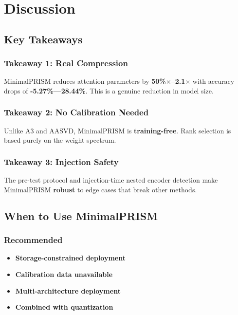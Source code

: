 
\section{Discussion}

\subsection{Key Takeaways}

\subsubsection{Takeaway 1: Real Compression}

MinimalPRISM reduces attention parameters by \textbf{50\%$\times$--2.1$\times$} 
with accuracy drops of \textbf{-5.27\%---28.44\%}. This is a genuine 
reduction in model size.

\subsubsection{Takeaway 2: No Calibration Needed}

Unlike A3 and AASVD, MinimalPRISM is \textbf{training-free}. Rank selection is 
based purely on the weight spectrum.

\subsubsection{Takeaway 3: Injection Safety}

The pre-test protocol and injection-time nested encoder detection make 
MinimalPRISM \textbf{robust} to edge cases that break other methods.

\subsection{When to Use MinimalPRISM}

\subsubsection{Recommended}

\begin{itemize}
\item \textbf{Storage-constrained deployment}
\item \textbf{Calibration data unavailable}
\item \textbf{Multi-architecture deployment}
\item \textbf{Combined with quantization}

\end{itemize}

